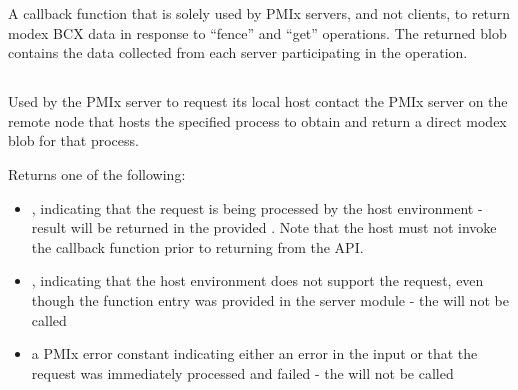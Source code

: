 A callback function that is solely used by PMIx servers, and not clients, to return modex \ac{BCX} data in response to ``fence'' and ``get'' operations.
The returned blob contains the data collected from each server participating in the operation.


\subsection{}

\summary

Used by the PMIx server to request its local host contact the \ac{PMIx} server on the remote node that hosts the specified process to obtain and return a direct modex blob for that process.

\format


\begin{arglist}
\end{arglist}

Returns one of the following:

\begin{itemize}
    \item {}, indicating that the request is being processed by the host environment - result will be returned in the provided . Note that the host must not invoke the callback function prior to returning from the \ac{API}.
    \item {}, indicating that the host environment does not support the request, even though the function entry was provided in the server module - the  will not be called
    \item a PMIx error constant indicating either an error in the input or that the request was immediately processed and failed - the  will not be called
\end{itemize}

